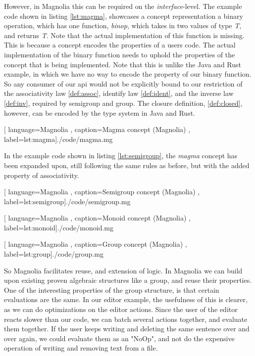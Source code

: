 However, in Magnolia this can be required on the \textit{interface}-level. The
example code shown in listing \ref{lst:magma}, showcases a concept
representation a binary operation, which has one function, \textit{binop}, which
takes in two values of type \textit{T}, and returns \textit{T}. Note that the
actual implementation of this function is missing. This is because a concept
encodes the properties of a users code. The actual implementation of the
binary function needs to uphold the properties of the concept that is
being implemented. Note that this is unlike the Java and Rust example, in
which we have no way to encode the property of our binary function. So any
consumer of our \gls*{api} would not be explicitly bound to our restriction of
the associativity law \ref{def:assoc}, identify law \ref{def:ident}, and the
inverse law \ref{def:inv}, required by semigroup and group. The closure
definition, \ref{def:closed}, however, can be encoded by the type system in Java
and Rust.

\begin{center}
  
    [ language=Magnolia
    , caption={Magma concept (Magnolia)}
    , label=lst:magma]{./code/magma.mg}
\end{center}

In the example code shown in listing \ref{lst:semigroup}, the \textit{magma}
concept has been expanded upon, still following the same rules as before, but
with the added property of associativity.

\begin{center}
  
    [ language=Magnolia
    , caption={Semigroup concept (Magnolia)}
    , label=lst:semigroup]{./code/semigroup.mg}
\end{center}

\begin{center}
  
    [ language=Magnolia
    , caption={Monoid concept (Magnolia)}
    , label=lst:monoid]{./code/monoid.mg}
\end{center}

\begin{center}
  
    [ language=Magnolia
    , caption={Group concept (Magnolia)}
    , label=lst:group]{./code/group.mg}
\end{center}

So Magnolia facilitates reuse, and extension of logic. In Magnolia we can build
upon existing proven algebraic structures like a group, and reuse their
properties. One of the interesting properties of the group structure, is that
certain evaluations are the same. In our editor example, the usefulness of this
is clearer, as we can do optimizations on the editor actions. Since the user of
the editor reacts slower than our code, we can batch several actions together,
and evaluate them together. If the user keeps writing and deleting the same
sentence over and over again, we could evaluate them as an "NoOp", and not do
the expensive operation of writing and removing text from a file.

